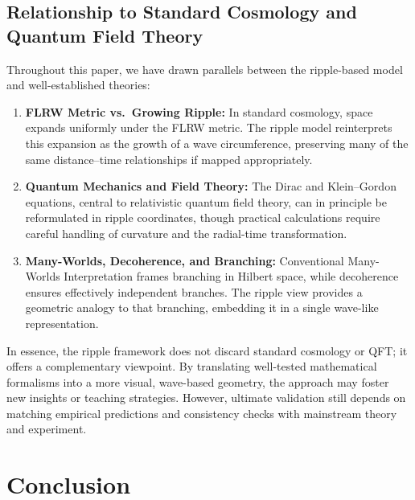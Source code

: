 \documentclass[11pt]{article}
\begin{document}
\subsection{Relationship to Standard Cosmology and Quantum Field Theory}
\label{subsec:relationship-standard}
Throughout this paper, we have drawn parallels between the ripple-based model 
and well-established theories:
\begin{enumerate}
  \item \textbf{FLRW Metric vs.\ Growing Ripple:} 
    In standard cosmology, space expands uniformly under the FLRW metric. 
    The ripple model reinterprets this expansion as the growth of a wave 
    circumference, preserving many of the same distance--time relationships 
    if mapped appropriately.
  \item \textbf{Quantum Mechanics and Field Theory:} 
    The Dirac and Klein--Gordon equations, central to relativistic quantum 
    field theory, can in principle be reformulated in ripple coordinates, 
    though practical calculations require careful handling of curvature 
    and the radial-time transformation.
  \item \textbf{Many-Worlds, Decoherence, and Branching:} 
    Conventional Many-Worlds Interpretation frames branching in Hilbert space, 
    while decoherence ensures effectively independent branches. The ripple 
    view provides a geometric analogy to that branching, embedding it in 
    a single wave-like representation.
\end{enumerate}
In essence, the ripple framework does not discard standard cosmology or QFT; 
it offers a complementary viewpoint. By translating well-tested mathematical 
formalisms into a more visual, wave-based geometry, the approach may foster 
new insights or teaching strategies. However, ultimate validation still depends 
on matching empirical predictions and consistency checks with mainstream theory 
and experiment.


\section{Conclusion}
\label{sec:conclusion}
\end{document}
